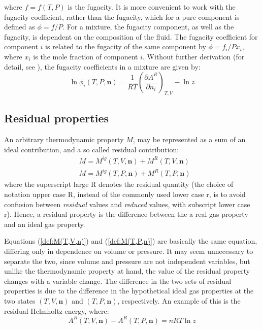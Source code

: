 \documentclass[internal,english]{sintefmemo2012}
\numberwithin{equation}{section}
\newcommand*{\pder}[2]{\left(\frac{\partial #1}{\partial #2}\right)}
\newcommand*{\reff}[1]{(\ref{#1})}
\begin{document}
where $f = f(T,P)$ is the fugacity. It is more convenient to work with the fugacity coefficient, rather than the fugacity, which for a pure component is defined as $\phi = f/P$. For a mixture, the fugacity component, as well as the fugacity, is dependent on the composition of the fluid. The fugacity coefficient for component $i$ is related to the fugacity of the same component by $\phi = f_i/P x_i$, where $x_i$ is the mole fraction of component $i$. Without further derivation (for detail, see \cite{MM}), the fugacity coefficients in a mixture are given by:
\begin{equation}
\label{def:lnphi}
\ln \phi_i (T,P,\textbf{n}) = \frac{1}{RT} \pder{A^R}{n_i}_{T,V} - \ln z
\end{equation}

\subsection{Residual properties}
An arbitrary thermodynamic property $M$,  may be represented as a sum of an ideal contribution, and a so called residual contribution:
\begin{align}
\label{def:M(T,V,n)}
& M = M^{ig}(T,V,\textbf{n}) + M^R(T,V,\textbf{n}) \\
\label{def:M(T,P,n)}
& M = M^{ig}(T,P,\textbf{n}) + M^R(T,P,\textbf{n}) 
\end{align}
where the superscript large R denotes the residual quantity (the choice of notation upper case R, instead of the commonly used lower case r, is to avoid confusion between \textit{residual} values and \textit{reduced} values, with subscript lower case r). Hence, a residual property is the difference between the a real gas property and an ideal gas property.

Equations \reff{def:M(T,V,n)} and \reff{def:M(T,P,n)} are basically the same equation, differing only in dependence on volume or pressure. It may seem unnecessary  to separate the two, since volume and pressure are not independent variables, but unlike the thermodynamic property at hand, the value of the residual property changes with a variable change. The difference in the two sets of residual properties is due to the difference in the hypothetical ideal gas properties at the two states $(T,V,\textbf{n})$ and $(T,P,\textbf{n})$, respectively. An example of this is the residual Helmholtz energy, where:
\begin{equation}
\label{eq:A^R(T,V,n)-A^R(T,P,n)}
A^R(T,V,\textbf{n}) - A^R(T,P,\textbf{n}) = nRT \ln z
\end{equation}
\end{document}
